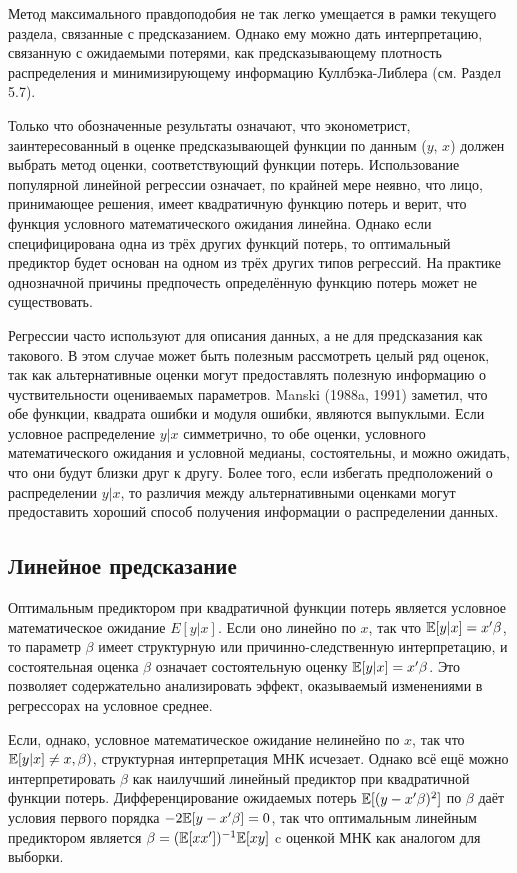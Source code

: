 Метод максимального правдоподобия не так легко умещается в рамки текущего раздела, связанные с предсказанием. Однако ему можно дать интерпретацию, связанную с ожидаемыми потерями, как предсказывающему плотность распределения и минимизирующему информацию Куллбэка-Либлера (см. Раздел 5.7).

Только что обозначенные результаты означают, что эконометрист, заинтересованный в оценке предсказывающей функции по данным ($y$, $x$) должен выбрать метод оценки, соответствующий функции потерь. Использование популярной линейной регрессии означает, по крайней мере неявно, что лицо, принимающее решения, имеет квадратичную функцию потерь и верит, что функция условного математического ожидания линейна. Однако если специфицирована одна из трёх других функций потерь, то оптимальный предиктор будет основан на одном из трёх других типов регрессий. На практике однозначной причины предпочесть определённую функцию потерь может не существовать.

Регрессии часто используют для описания данных, а не для предсказания как такового. В этом случае может быть полезным рассмотреть целый ряд оценок, так как альтернативные оценки могут предоставлять полезную информацию о чуствительности оцениваемых параметров. Manski (1988a, 1991) заметил, что обе функции, квадрата ошибки и модуля ошибки, являются выпуклыми. Если условное распределение $y|x$ симметрично, то обе оценки, условного математического ожидания и условной медианы, состоятельны, и можно ожидать, что они будут близки друг к другу. Более того, если избегать предположений о распределении $y|x$, то различия между альтернативными оценками могут предоставить хороший способ получения информации о распределении данных.

\subsection{Линейное предсказание}
Оптимальным предиктором при квадратичной функции потерь является условное математическое ожидание $E{[y|x]}$. Если оно линейно по $x$, так что $\mathbb{E}{[y|x]} = x' \beta $, то параметр $\beta$ имеет структурную или причинно-следственную интерпретацию, и состоятельная оценка $\beta$ означает состоятельную оценку $\mathbb{E}{[y|x]} = x' \beta $. Это позволяет 	содержательно анализировать эффект, оказываемый изменениями в регрессорах на условное среднее.

Если, однако, условное математическое ожидание нелинейно по $x$, так что $\mathbb{E}{[y|x]} \neq x, \beta)$, структурная интерпретация МНК исчезает. Однако всё ещё можно интерпретировать $\beta$ как наилучший линейный предиктор при квадратичной функции потерь. Дифференцирование ожидаемых потерь $\mathbb{E}{[(y - x' \beta)^2]}$ по $\beta$ даёт условия первого порядка $-2 \mathbb{E}{[y - x' \beta]} =0 $, так что оптимальным линейным предиктором является $\beta = (\mathbb{E}[xx'])^{-1}\mathbb{E}[xy]$ c оценкой МНК как аналогом для выборки.

